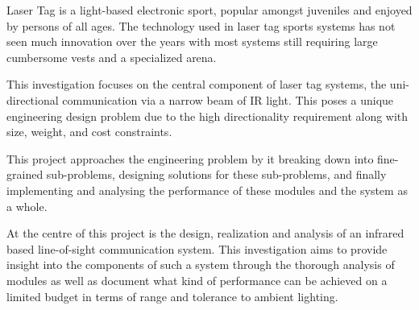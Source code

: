 Laser Tag is a light-based electronic sport, popular amongst juveniles and enjoyed by persons of all ages. The technology used in laser tag sports systems has not seen much innovation over the years with most systems still requiring large cumbersome vests and a specialized arena.

This investigation focuses on the central component of laser tag systems, the uni-directional communication via a narrow beam of IR light. This poses a unique engineering design problem due to the high directionality requirement along with size, weight, and cost constraints.

This project approaches the engineering problem by it breaking down into fine-grained sub-problems, designing solutions for these sub-problems, and finally implementing and analysing the performance of these modules and the system as a whole.

At the centre of this project is the design, realization and analysis of an infrared based line-of-sight communication system. This investigation aims to provide insight into the components of such a system through the thorough analysis of modules as well as document what kind of performance can be achieved on a limited budget in terms of range and tolerance to ambient lighting.



